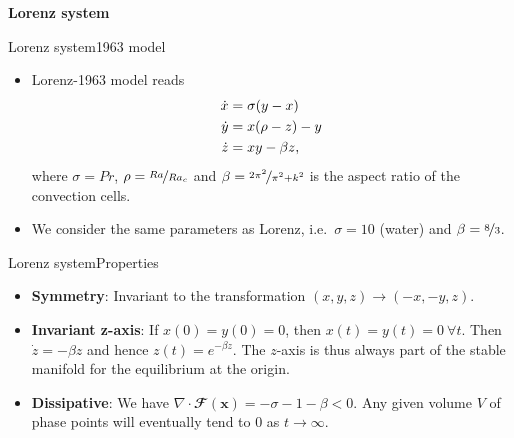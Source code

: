 \documentclass[usenames,dvipsnames,svgnames,10pt,aspectratio=169]{beamer}
\begin{document}
\begin{frame}[t, c]{}
	\centering
	\vspace{1cm}

	{\Large \textbf{Lorenz system}}

	\bigskip

	{}

\end{frame}

\begin{frame}[t, c]{Lorenz system}{1963 model}
	\begin{itemize}
		\item Lorenz-1963 model reads
		\begin{equation}
			\begin{aligned}
				\dot{x} & = \sigma ( y - x ) \\
				\dot{y} & = x ( \rho - z ) - y \\
				\dot{z} & = xy - \beta z,
			\end{aligned}
			\notag
		\end{equation}
		where $\sigma = Pr$, $\rho = \nicefrac{Ra}{Ra_c}$ and $\beta = \nicefrac{2\pi^2}{\pi^2+k^2}$ is the aspect ratio of the convection cells.

		\bigskip

		\item We consider the same parameters as Lorenz, i.e.\ $\sigma = 10$ (water) and $\beta = \nicefrac{8}{3}$.
	\end{itemize}

	\vspace{1cm}
\end{frame}

\begin{frame}[t, c]{Lorenz system}{Properties}
	\begin{itemize}
		\item \alert{\textbf{Symmetry}}: Invariant to the transformation $(x, y, z) \to (-x, -y, z)$.

		\bigskip

		\item \alert{\textbf{Invariant z-axis}}: If $x(0) = y(0) = 0$, then $x(t) = y(t) = 0 \ \forall t$. Then $\dot{z} = - \beta z$ and hence $z(t) = e^{-\beta z}$. The $z$-axis is thus always part of the stable manifold for the equilibrium at the origin.

		\bigskip

		\item \alert{\textbf{Dissipative}}: We have $\nabla \cdot \mathbfcal{F}(\mathbf{x}) = - \sigma - 1 - \beta < 0$. Any given volume $V$ of phase points will eventually tend to $0$ as $t \to \infty$.
	\end{itemize}

	\vspace{1cm}
\end{frame}
\end{document}
